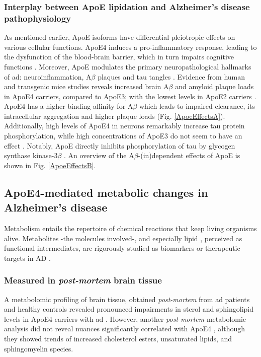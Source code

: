 \documentclass{amsart}
\begin{document}
\subsubsection{Interplay between ApoE lipidation and Alzheimer's disease pathophysiology}\label{ApoEAD}
As mentioned earlier, ApoE isoforms have differential pleiotropic effects on various cellular functions. ApoE4 induces a pro-inflammatory response, leading to the dysfunction of the blood-brain barrier, which in turn impairs cognitive functions \cite{Marottoli2017PeripheralDysfunction, Teng2017ApoEInjury, Kloske2020TheDisease}. Moreover, ApoE modulates the primary neuropathological hallmarks of \acrshort{ad}: neuroinflammation, A$\beta$ plaques and tau tangles \cite{Husain2021APOETherapeutics}. Evidence from human and transgenic mice studies reveals increased brain A$\beta$ and amyloid plaque loads in ApoE4 carriers, compared to ApoE3; with the lowest levels in ApoE2 carriers \cite{Huang2017ApoE2Secretion, Tachibana2016RescuingLRP1, Safieh2019ApoE4:Disease}. ApoE4 has a higher binding affinity for A$\beta$ which leads to impaired clearance, its intracellular aggregation and higher plaque loads \cite{Kloske2020TheDisease} (Fig. \ref{ApoeEffectsA}). Additionally, high levels of ApoE4 in neurons remarkably increase tau protein phosphorylation, while high concentrations of ApoE3 do not seem to have an effect \cite{Cao2017ApoE4-associatedInjury, Shi2017ApoE4Tauopathy, Vasilevskaya2020InteractionAthletes, Wang2018GainCorrector}. Notably,  ApoE directly inhibits phosphorylation of tau by glycogen synthase kinase-3$\beta$ \cite{Hoe2006ApolipoproteinNeurons}. An overview of the A$\beta$-(in)dependent effects of ApoE is shown in Fig. \ref{ApoeEffectsB}.

\subsection{ApoE4-mediated metabolic changes in Alzheimer's disease}
Metabolism entails the repertoire of chemical reactions that keep living organisms alive. Metabolites -the molecules involved-, and especially lipid \cite{Barupal2019SetsPathophysiology,Fernandez-Calle2022APOEDiseases, Proitsi2017AssociationAnalysis}, perceived as functional intermediates, are rigorously studied as biomarkers or therapeutic targets in AD \cite{Oeckl2019GlialImpairment}.
 
\subsubsection{Measured in \textit{post-mortem} brain tissue} A metabolomic profiling of brain tissue, obtained \textit{post-mortem} from \acrshort{ad} patients and healthy controls revealed  pronounced impairments in sterol and sphingolipid levels in ApoE4 carriers with \acrshort{ad}  \cite{Bandaru2009ApoE4Brain}. However, another \textit{post-mortem} metabolomic analysis did not reveal nuances significantly correlated with ApoE4 \cite{Novotny2023MetabolomicBrains}, although they showed trends of increased cholesterol esters, unsaturated lipids, and sphingomyelin species.
\end{document}
